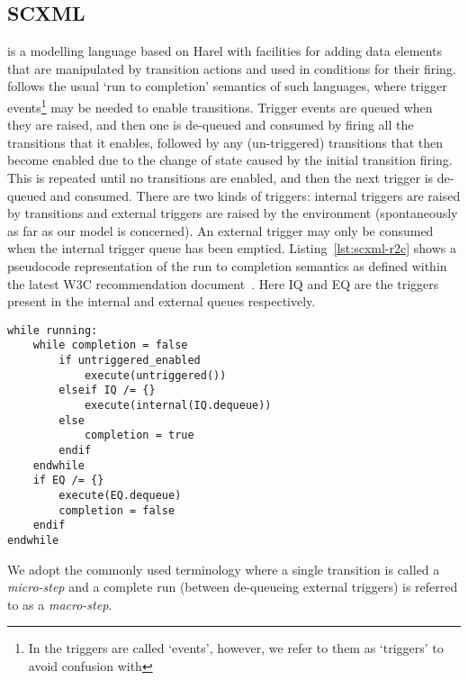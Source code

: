 

\subsection{SCXML}
\label{sec:scxml}

\SCXML is a modelling language based on Harel \statecharts with facilities for adding data elements that are manipulated by transition actions and used in conditions for their firing. \SCXML follows the usual `run to completion' semantics of such \statechart languages, where trigger events\footnote{In \SCXML the triggers are called `events', however, we refer to them as `triggers' to avoid confusion with \EventB} may be needed to enable transitions. Trigger events are queued when they are raised, and then one is de-queued and consumed by firing all the transitions that it enables, followed by any (un-triggered) transitions that then become enabled due to the change of state caused by the initial transition firing. This is repeated until no transitions are enabled, and then the next trigger is de-queued and consumed. There are two kinds of triggers: internal triggers are raised by transitions and external triggers are raised by the environment (spontaneously as far as our model is concerned). An external trigger may only be consumed when the internal trigger queue has been emptied. Listing~\ref{lst:scxml-r2c} shows a pseudocode representation of the run to completion semantics as defined within the latest W3C recommendation document~\cite{scxmlwebsite}. Here IQ and EQ are the triggers present in the internal and external queues respectively. 
\begin{lstlisting}[caption=Pseudocode for 'run to completion',label={lst:scxml-r2c}, frame=single]
while running:
	while completion = false
		if untriggered_enabled
			execute(untriggered())
		elseif IQ /= {}
			execute(internal(IQ.dequeue)) 
		else
			completion = true
		endif
	endwhile
	if EQ /= {}
		execute(EQ.dequeue) 
		completion = false
	endif
endwhile 
\end{lstlisting}

We adopt the commonly used terminology where a single transition is called a \emph{micro-step} and a complete run (between de-queueing external triggers) is referred to as a \emph{macro-step}.

